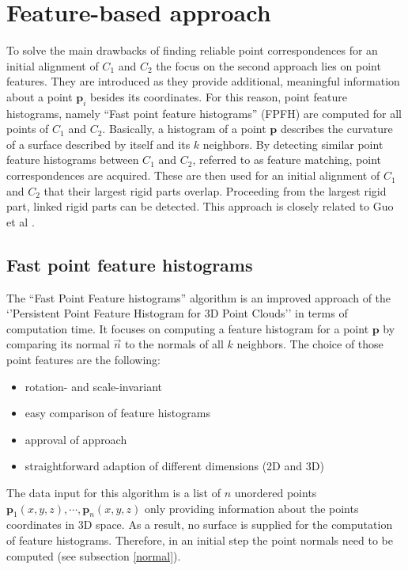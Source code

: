 \chapter{Feature-based approach}
\label{cha:FeatureApproach}

To solve the main drawbacks of finding reliable point correspondences for an initial alignment of $C_1$ and $C_2$ the focus on the second approach lies on point features. They are introduced as they provide additional, meaningful information about a point $\boldsymbol{p}_i$ besides its coordinates. For this reason, point feature histograms, namely ``Fast point feature histograms'' (FPFH) \cite{FPFH} are computed for all points of $C_1$ and $C_2$. Basically, a histogram of a point $\boldsymbol{p}$ describes the curvature of a surface described by itself and its $k$ neighbors. By detecting similar point feature histograms between $C_1$ and $C_2$, referred to as feature matching, point correspondences are acquired. These are then used for an initial alignment of $C_1$ and $C_2$ that their largest rigid parts overlap. Proceeding from the largest rigid part, linked rigid parts can be detected. This approach is closely related to Guo et al \cite{guo2016correspondence}. 

\section{Fast point feature histograms}
\label{FPFH}
The ``Fast Point Feature histograms'' algorithm is an improved approach of the `'Persistent Point Feature Histogram for 3D Point Clouds'' \cite{PPFH} in terms of computation time. It focuses on computing a feature histogram for a point $\boldsymbol{p}$ by comparing its normal $\vec{n}$ to the normals of all $k$ neighbors. The choice of those point features are the following: 
\begin{itemize}
	\item rotation- and scale-invariant
	\item easy comparison of feature histograms
	\item approval of approach
	\item straightforward adaption of different dimensions (2D and 3D)
\end{itemize}
The data input for this algorithm is a list of $n$ unordered points $\boldsymbol{p}_1(x,y,z), \cdots, \boldsymbol{p}_n(x,y,z)$ only providing information about the points coordinates in 3D space. As a result, no surface is supplied for the computation of feature histograms. Therefore, in an initial step the point normals need to be computed (see subsection \ref{normal}).

